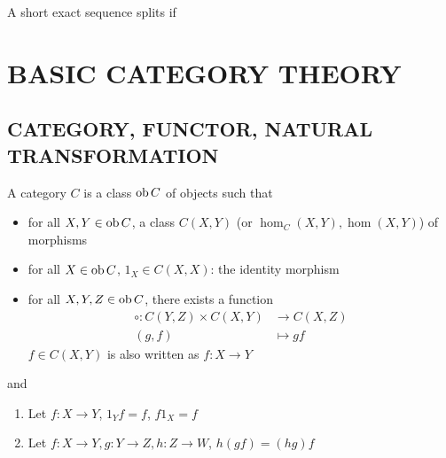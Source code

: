 \documentclass{report}
\begin{document}
\begin{definition}
    A short exact sequence splits if
\end{definition}

\section{BASIC CATEGORY THEORY}

\subsection{CATEGORY, FUNCTOR, NATURAL TRANSFORMATION}

\begin{definition}[category]
    A category $C$ is a class $\operatorname{ob} C$ of objects such that
    \begin{itemize}
        \item for all $X, Y \in \operatorname{ob} C$, a class $C(X, Y)$ (or $\hom_C(X, Y), \hom(X, Y)$) of morphisms
        \item for all $X \in \operatorname{ob} C$, $1_X \in C(X, X)$: the identity morphism
        \item for all $X, Y, Z \in \operatorname{ob} C$, there exists a function
        \begin{align*}
            \circ   : C(Y, Z) \times C(X, Y) &\to C(X, Z) \\
                    (g, f) &\mapsto gf
        \end{align*}
        $f \in C(X, Y)$ is also written as $f: X \to Y$
    \end{itemize}
    and
    \begin{enumerate}
        \item Let $f: X \to Y$, $1_Y f = f$, $f 1_X = f$
        \begin{center}
        \end{center}

        \item Let $f: X \to Y, g: Y \to Z, h: Z \to W$, $h(gf) = (hg)f$
        \begin{center}
        
        \end{center}
    \end{enumerate}
\end{definition}
\end{document}
